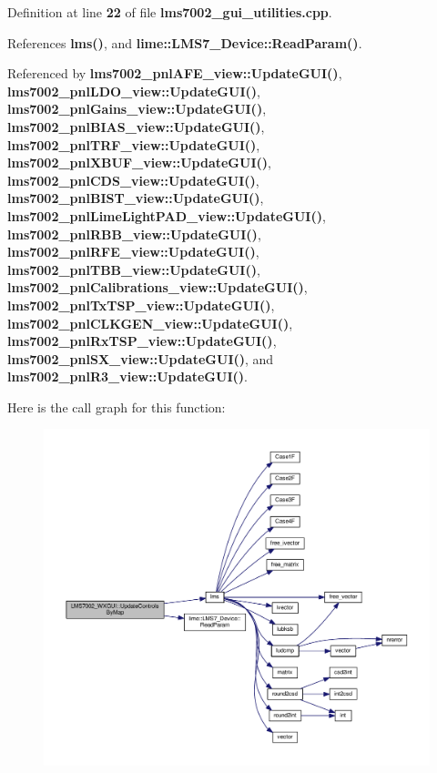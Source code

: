 Definition at line {\bf 22} of file {\bf lms7002\+\_\+gui\+\_\+utilities.\+cpp}.



References {\bf lms()}, and {\bf lime\+::\+L\+M\+S7\+\_\+\+Device\+::\+Read\+Param()}.



Referenced by {\bf lms7002\+\_\+pnl\+A\+F\+E\+\_\+view\+::\+Update\+G\+U\+I()}, {\bf lms7002\+\_\+pnl\+L\+D\+O\+\_\+view\+::\+Update\+G\+U\+I()}, {\bf lms7002\+\_\+pnl\+Gains\+\_\+view\+::\+Update\+G\+U\+I()}, {\bf lms7002\+\_\+pnl\+B\+I\+A\+S\+\_\+view\+::\+Update\+G\+U\+I()}, {\bf lms7002\+\_\+pnl\+T\+R\+F\+\_\+view\+::\+Update\+G\+U\+I()}, {\bf lms7002\+\_\+pnl\+X\+B\+U\+F\+\_\+view\+::\+Update\+G\+U\+I()}, {\bf lms7002\+\_\+pnl\+C\+D\+S\+\_\+view\+::\+Update\+G\+U\+I()}, {\bf lms7002\+\_\+pnl\+B\+I\+S\+T\+\_\+view\+::\+Update\+G\+U\+I()}, {\bf lms7002\+\_\+pnl\+Lime\+Light\+P\+A\+D\+\_\+view\+::\+Update\+G\+U\+I()}, {\bf lms7002\+\_\+pnl\+R\+B\+B\+\_\+view\+::\+Update\+G\+U\+I()}, {\bf lms7002\+\_\+pnl\+R\+F\+E\+\_\+view\+::\+Update\+G\+U\+I()}, {\bf lms7002\+\_\+pnl\+T\+B\+B\+\_\+view\+::\+Update\+G\+U\+I()}, {\bf lms7002\+\_\+pnl\+Calibrations\+\_\+view\+::\+Update\+G\+U\+I()}, {\bf lms7002\+\_\+pnl\+Tx\+T\+S\+P\+\_\+view\+::\+Update\+G\+U\+I()}, {\bf lms7002\+\_\+pnl\+C\+L\+K\+G\+E\+N\+\_\+view\+::\+Update\+G\+U\+I()}, {\bf lms7002\+\_\+pnl\+Rx\+T\+S\+P\+\_\+view\+::\+Update\+G\+U\+I()}, {\bf lms7002\+\_\+pnl\+S\+X\+\_\+view\+::\+Update\+G\+U\+I()}, and {\bf lms7002\+\_\+pnl\+R3\+\_\+view\+::\+Update\+G\+U\+I()}.



Here is the call graph for this function\+:
\nopagebreak
\begin{figure}[H]
\begin{center}
\leavevmode
\includegraphics[width=350pt]{de/df1/namespaceLMS7002__WXGUI_a1802e1e2f9704b2905e1653bdb35f30d_cgraph}
\end{center}
\end{figure}




